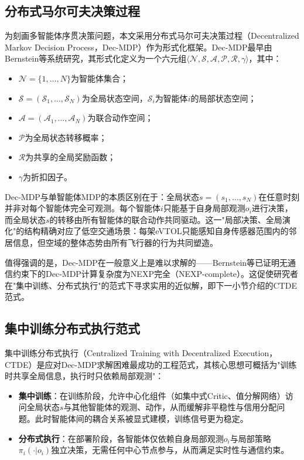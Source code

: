 \documentclass[12pt,a4paper,UTF8]{ctexbook}
\begin{document}
\subsection{分布式马尔可夫决策过程}

为刻画多智能体序贯决策问题，本文采用分布式马尔可夫决策过程（Decentralized Markov Decision Process，Dec-MDP）作为形式化框架。Dec-MDP最早由Bernstein等\cite{ref41}系统研究，其形式化定义为一个六元组$\langle\mathcal{N},\mathcal{S},\mathcal{A},\mathcal{P},\mathcal{R},\gamma\rangle$，其中：
\begin{itemize}
    \item $\mathcal{N}=\{1,\ldots,N\}$为智能体集合；
    \item $\mathcal{S}=(\mathcal{S}_1,\ldots,\mathcal{S}_N)$为全局状态空间，$\mathcal{S}_i$为智能体$i$的局部状态空间；
    \item $\mathcal{A}=(\mathcal{A}_1,\ldots,\mathcal{A}_N)$为联合动作空间；
    \item $\mathcal{P}$为全局状态转移概率；
    \item $\mathcal{R}$为共享的全局奖励函数；
    \item $\gamma$为折扣因子。
\end{itemize}

Dec-MDP与单智能体MDP的本质区别在于：全局状态$s=(s_1,\ldots,s_N)$在任意时刻并非对每个智能体完全可观测。每个智能体$i$只能基于自身局部观测$o_i$进行决策，而全局状态$s$的转移由所有智能体的联合动作共同驱动。这一"局部决策、全局演化"的结构精确对应了低空交通场景：每架eVTOL只能感知自身传感器范围内的邻居信息，但空域的整体态势由所有飞行器的行为共同塑造。

值得强调的是，Dec-MDP在一般意义上是难以求解的——Bernstein等\cite{ref41}已证明无通信约束下的Dec-MDP计算复杂度为NEXP完全（NEXP-complete）。这促使研究者在"集中训练、分布式执行"的范式下寻求实用的近似解，即下一小节介绍的CTDE范式。

\subsection{集中训练分布式执行范式}

集中训练分布式执行（Centralized Training with Decentralized Execution，CTDE）是应对Dec-MDP求解困难最成功的工程范式，其核心思想可概括为"训练时共享全局信息，执行时只依赖局部观测"：

\begin{itemize}
    \item \textbf{集中训练}：在训练阶段，允许中心化组件（如集中式Critic、值分解网络）访问全局状态$s$与其他智能体的观测、动作，从而缓解非平稳性与信用分配问题。此时智能体间的耦合关系被显式建模，训练信号更为稳定。
    \item \textbf{分布式执行}：在部署阶段，各智能体仅依赖自身局部观测$o_i$与局部策略$\pi_i(\cdot|o_i)$独立决策，无需任何中心节点参与，从而满足实时性与通信约束。
\end{itemize}
\end{document}
